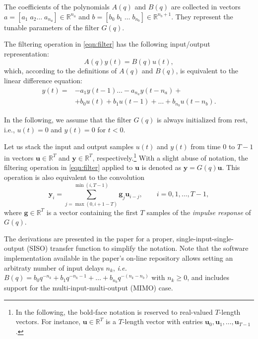 \documentclass{article}
\newcommand{\R}{\mathbb{R}} %
\newcommand{\q}{q} %
\newcommand{\A}{A} %
\newcommand{\ac}{a} %
\newcommand{\B}{B} %
\newcommand{\bb}{b} %
\newcommand{\tvec}[1]{\mathbf{#1}}
\newcommand{\nsamp}{T}
\begin{document}
The coefficients   of the polynomials $\A(q)$ and $\B(q)$ are collected in vectors  $\ac = [\ac_1\; \ac_2\dots\;\ac_{n_\ac}] \in \R^{n_\ac}$ and $\bb = [\bb_0\; \bb_1\; \dots \;\bb_{n_\bb}] \in \R^{n_\bb + 1}$. They represent 
 the tunable parameters of the filter $G(q)$. 


The filtering operation  in \eqref{eqn:filter} has the following  input/output representation:
\begin{equation} \label{eqn:filterA}
\A(\q)y(t) =  \B(\q)u(t),
\end{equation}
which, according to the definitions of $\A(q)$ and $\B(q)$, is equivalent to the linear difference  equation:
\begin{align}
\label{eq:OE_predictor_b}
y(t) = & -\ac_1 y(t\!-\!1) \dots - \ac_{n_\ac} y(t\!-\!n_\ac) + \nonumber \\
& + \bb_0 u(t) + \bb_1 u(t-1) + \dots + \bb_{n_\bb}\!u(t-n_\bb).
\end{align}

 In the following, we assume that the filter $G(\q)$ is always initialized from rest, i.e., $u(t)=0$ and $y(t)=0$ for $t < 0$. 
 
 
 Let us stack the input and output samples $u(t)$ and $y(t)$ from time $0$ to $\nsamp\!-\!1$ in vectors $\tvec{u} \in \mathbb{R}^{\nsamp}$  and $\tvec{y} \in \mathbb{R}^{\nsamp}$, respectively.\footnote{In the following, the bold-face notation is reserved to real-valued $\nsamp$-length vectors.  For instance, $\tvec{u} \in \R^{\nsamp}$ is a $T$-length vector with entries $\tvec{u}_0, \tvec{u}_1, \dots, \tvec{u}_{\nsamp -1}$.} 
 With a slight abuse of notation, the filtering operation in \eqref{eqn:filter} applied to $\tvec{u}$ is denoted as %
 $
 \tvec{y} = G(\q)\tvec{u}$. 
 This operation is also equivalent to the convolution 
 \begin{equation}
 \label{eq:G_conv}
 \tvec{y}_i =  \sum_{j=\max{(0, i+1-T)}}^{\min(i, T-1)} \tvec{g}_j \tvec{u}_{i-j},\qquad  
 i=0,1,\dots,\nsamp\!-\!1,
 \end{equation}
 where $\tvec{g} \in \R^{\nsamp}$ is a vector containing the first $\nsamp$ samples of the  \emph{impulse response} of $G(q)$.  

  
The derivations are presented in the paper for a proper, single-input-single-output (SISO) transfer function to simplify the notation. Note that the software implementation available in the paper's on-line repository 
allows setting an arbitraty number of input delays $n_k$, {\emph{i.e.} $\B(q) = \bb_0 \q^{-n_k} + \bb_1 \q^{-n_k-1} +  \dots + \bb_{n_{\bb}}q^{-(n_k-n_{\bb})}$ with $n_k \geq 0$}, and includes support for the multi-input-multi-output (MIMO) case.
\end{document}
